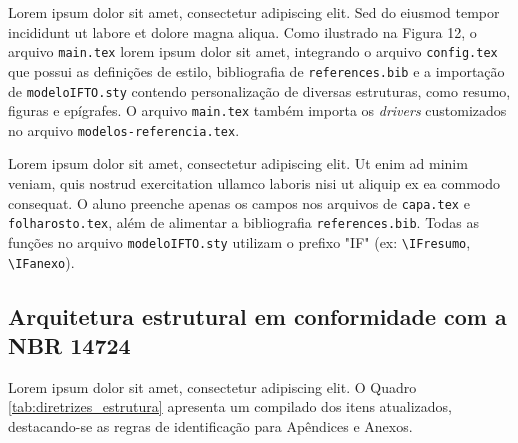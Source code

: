 \documentclass[12pt,a4paper]{article}
\begin{document}
Lorem ipsum dolor sit amet, consectetur adipiscing elit. Sed do eiusmod tempor incididunt ut labore et dolore magna aliqua. Como ilustrado na Figura 12, o arquivo \verb|main.tex| lorem ipsum dolor sit amet, integrando o arquivo \verb|config.tex| que possui as definições de estilo, bibliografia de \verb|references.bib| e a importação de \verb|modeloIFTO.sty| contendo personalização de diversas estruturas, como resumo, figuras e epígrafes. O arquivo \verb|main.tex| também importa os \textit{drivers} customizados no arquivo \verb|modelos-referencia.tex|.


Lorem ipsum dolor sit amet, consectetur adipiscing elit. Ut enim ad minim veniam, quis nostrud exercitation ullamco laboris nisi ut aliquip ex ea commodo consequat. O aluno preenche apenas os campos nos arquivos de \verb|capa.tex| e \verb|folharosto.tex|, além de alimentar a bibliografia \verb|references.bib|. Todas as funções no arquivo \verb|modeloIFTO.sty| utilizam o prefixo "IF" (ex: \verb|\IFresumo|, \verb|\IFanexo|). 

\subsection{Arquitetura estrutural em conformidade com a NBR 14724}

Lorem ipsum dolor sit amet, consectetur adipiscing elit. O Quadro \ref{tab:diretrizes_estrutura} apresenta um compilado dos itens atualizados, destacando-se as regras de identificação para Apêndices e Anexos.
\end{document}
